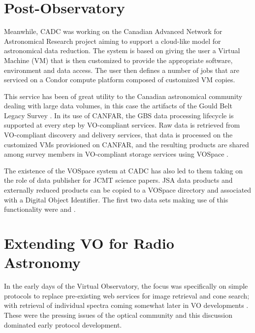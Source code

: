 \documentclass[final,authoryear,5p,times,twocolumn]{elsarticle}
\begin{document}
\section{Post-Observatory}

Meanwhile, CADC was working on the Canadian Advanced Network for
Astronomical Research \citep[CANFAR;][]{2010SPIE.7740E..51G,2015ACCADC} project aiming to
support a cloud-like model for astronomical data reduction. The system
is based on giving the user a Virtual Machine (VM) that is then customized to
provide the appropriate software, environment and data access. The
user then defines a number of jobs that are serviced on a Condor
compute platform composed of customized VM copies.

This service has been of great utility to the Canadian astronomical
community dealing with large data volumes, in this case the artifacts of
the Gould Belt Legacy Survey \citep[GBS;][]{2007PASP..119..855W}.
In its use of CANFAR, the GBS data
processing lifecycle is supported at every step by VO-compliant services.
Raw data is retrieved from VO-compliant discovery and delivery services,
that data is processed on the customized VMs provisioned on CANFAR, and
the resulting products are shared among survey members in VO-compliant
storage services using VOSpace \citep{vospace}.

The existence of the VOSpace system at CADC has also led to them
taking on the role of data publisher for JCMT science papers.
JSA data products and externally reduced products can be copied to a
VOSpace directory and associated with a
Digital Object Identifier. The first two data sets making use of this
functionality were \citet{2012MNRAS.424.3050W} and
\citet{2013ApJS..209....8D}.

\section{Extending VO for Radio Astronomy}

In the early days of the Virtual Observatory, the focus was
specifically on simple protocols \citep{siap,cone} to replace pre-existing
web services for image retrieval and cone search; with retrieval of
individual spectra coming somewhat later in VO developments
\citep{ssap,splatvo}. These were the pressing issues of the optical
community and this discussion dominated early protocol development.
\end{document}
